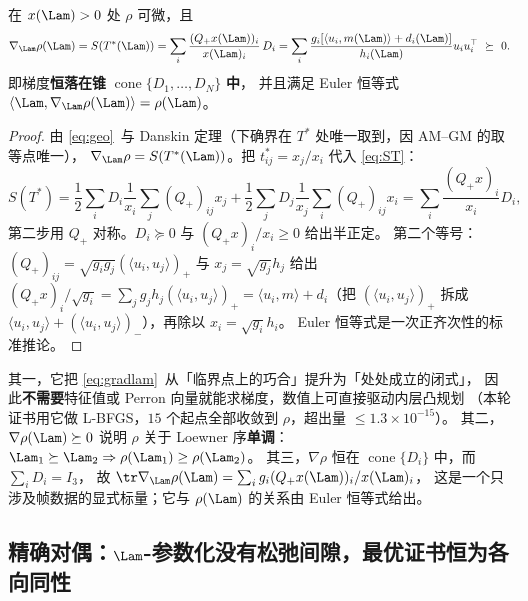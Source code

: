 \begin{corollary}[闭式梯度恒半正定]\label{cor:gradpsi}
在 $x(\Lam)>0$ 处 $\rho$ 可微，且
\begin{equation}\label{eq:gradpsi}
\nabla_\Lam\rho(\Lam)=S(T^*(\Lam))=\sum_i\frac{(Q_+x(\Lam))_i}{x(\Lam)_i}\,D_i
=\sum_i\frac{g_i[\langle u_i,m(\Lam)\rangle+d_i(\Lam)]}{h_i(\Lam)}u_iu_i^\top\ \succeq\ 0 .
\end{equation}
即梯度\textbf{恒落在锥} $\operatorname{cone}\{D_1,\dots,D_N\}$ \textbf{中}，
并且满足 Euler 恒等式 $\langle\Lam,\nabla_\Lam\rho(\Lam)\rangle=\rho(\Lam)$。
\end{corollary}

\begin{proof}
由 \eqref{eq:geo}~与 Danskin 定理（下确界在 $T^*$ 处唯一取到，因 AM--GM 的取等点唯一），
$\nabla_\Lam\rho=S(T^*(\Lam))$。把 $t^*_{ij}=x_j/x_i$ 代入 \eqref{eq:ST}：
\[
S(T^*)=\frac12\sum_i D_i\frac1{x_i}\sum_j(Q_+)_{ij}x_j+\frac12\sum_j D_j\frac1{x_j}\sum_i(Q_+)_{ij}x_i
=\sum_i\frac{(Q_+x)_i}{x_i}D_i ,
\]
第二步用 $Q_+$ 对称。$D_i\succeq0$ 与 $(Q_+x)_i/x_i\ge0$ 给出半正定。
第二个等号：$(Q_+)_{ij}=\sqrt{g_ig_j}(\langle u_i,u_j\rangle)_+$ 与 $x_j=\sqrt{g_j}h_j$ 给出
$(Q_+x)_i/\sqrt{g_i}=\sum_jg_jh_j(\langle u_i,u_j\rangle)_+
=\langle u_i,m\rangle+d_i$（把 $(\langle u_i,u_j\rangle)_+$ 拆成
$\langle u_i,u_j\rangle+(\langle u_i,u_j\rangle)_-$），再除以 $x_i=\sqrt{g_i}h_i$。
Euler 恒等式是一次正齐次性的标准推论。
\end{proof}

\begin{remark}[这条梯度公式的用处]\label{rmk:gradpsi}
其一，它把 \eqref{eq:gradlam}~从「临界点上的巧合」提升为「处处成立的闭式」，
因此\textbf{不需要}特征值或 Perron 向量就能求梯度，数值上可直接驱动内层凸规划
（本轮证书用它做 L-BFGS，$15$ 个起点全部收敛到 $\rho$，超出量 $\le1.3\times10^{-15}$）。
其二，$\nabla\rho(\Lam)\succeq0$ 说明 $\rho$ 关于 Loewner 序\textbf{单调}：
$\Lam_1\succeq\Lam_2\Rightarrow\rho(\Lam_1)\ge\rho(\Lam_2)$。
其三，$\nabla\rho$ 恒在 $\operatorname{cone}\{D_i\}$ 中，而 $\sum_iD_i=I_3$，
故 $\tr\nabla_\Lam\rho(\Lam)=\sum_ig_i(Q_+x(\Lam))_i/x(\Lam)_i$，
这是一个只涉及帧数据的显式标量；它与 $\rho(\Lam)$ 的关系由 Euler 恒等式给出。
\end{remark}

\subsection{精确对偶：$\Lam$-参数化没有松弛间隙，最优证书恒为各向同性}\label{sec:r19:dual}

